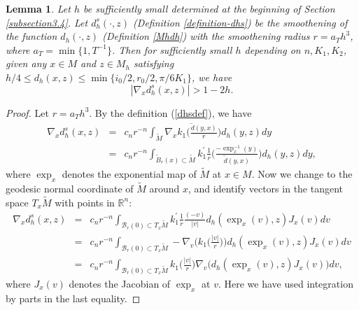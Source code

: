\documentclass[11pt,letterpaper]{amsart}
\numberwithin{equation}{section}
\theoremstyle{definition}
\theoremstyle{plain}
\theoremstyle{definition}
\theoremstyle{plain}
\theoremstyle{definition}
\theoremstyle{plain}
\newtheorem{dd}[riccati]{Lemma}
\begin{document}
\begin{dd}\label{dd}
Let $h$ be sufficiently small determined at the beginning of Section \ref{subsection3.4}. Let $d_h^s(\cdot,z)$ (Definition \ref{definition-dhs}) be the smoothening of the function $d_h(\cdot,z)$ (Definition \ref{Mhdh}) with the smoothening radius $r=a_T h^3$, where $a_T=\min\{1,T^{-1}\}$. Then for sufficiently small $h$ depending on $n,K_1,K_2$, given any $x\in M$ and $z\in M_h$ satisfying $h/4 \leqslant d_h (x,z)\leqslant \min\{i_0/2,r_0/2,\pi/6K_1\}$, we have
$$|\nabla_x d_h^s(x,z)|> 1-2h.$$
\end{dd}
\begin{proof}
Let $r=a_T h^3$. By the definition (\ref{dhsdef}), we have
\begin{eqnarray*}
\nabla_x d_h^s(x,z)&=&c_{n}r^{-n}\int_{\widetilde{M}}\nabla_x k_1\big(\frac{\widetilde{d}(y,x)}{r}\big)d_h(y,z)dy \\
&=& c_{n}r^{-n} \int_{\widetilde{B}_r(x)\subset \widetilde{M}} k_1^{\prime}\frac{1}{r} \big(\frac{-\exp_{x}^{-1}(y)}{\widetilde{d}(y,x)} \big) d_h(y,z) dy,
\end{eqnarray*}
where $\exp_x$ denotes the exponential map of $\widetilde{M}$ at $x\in M$. Now we change to the geodesic normal coordinate of $\widetilde{M}$ around $x$, and identify vectors in the tangent space $T_x\widetilde{M}$ with points in $\mathbb{R}^n$:
\begin{eqnarray*}
\nabla_x d_h^s(x,z) 
&=&c_{n}r^{-n} \int_{\mathcal{B}_{r}(0)\subset T_x \widetilde{M}} k_1^{\prime}\frac{1}{r} \frac{(-v)}{|v|} d_h(\exp_x(v),z) J_x(v) dv \\
&=& c_{n}r^{-n} \int_{\mathcal{B}_{r}(0)\subset T_x \widetilde{M}}  -\nabla_v \Big(k_1\big(\frac{|v|}{r}\big)\Big) d_h(\exp_x(v),z) J_x(v) dv \\
&=& c_{n}r^{-n} \int_{\mathcal{B}_{r}(0)\subset T_x \widetilde{M}}  k_1\big(\frac{|v|}{r}\big) \nabla_v\big(d_h(\exp_x(v),z) J_x(v)\big) dv,
\end{eqnarray*}
where $J_x(v)$ denotes the Jacobian of $\exp_x$ at $v$. Here we have used integration by parts in the last equality.


\end{proof}
\end{document}
